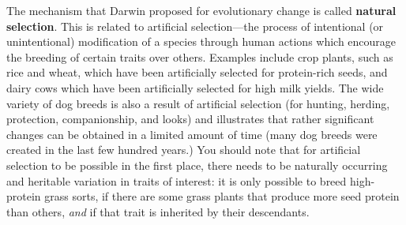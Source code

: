 \documentclass[11pt,a4paper]{book}
\begin{document}
The mechanism that Darwin proposed for evolutionary change is called {\bf natural selection}. This is related to artificial selection---the process of intentional (or unintentional) modification of a species through human actions which encourage the breeding of certain traits over others. Examples include crop plants, such as rice and wheat, which have been artificially selected for protein-rich seeds, and dairy cows which have been artificially selected for high milk yields. The wide variety of dog breeds is also a result of artificial selection (for hunting, herding, protection, companionship, and looks) and illustrates that rather significant changes can be obtained in a limited amount of time (many dog breeds were created in the last few hundred years.) You should note that for artificial selection to be possible in the first place, there needs to be naturally occurring and heritable variation in traits of interest: it is only possible to breed high-protein grass sorts, if there are some grass plants that produce more seed protein than others, \emph{and} if that trait is inherited by their descendants.
\end{document}
